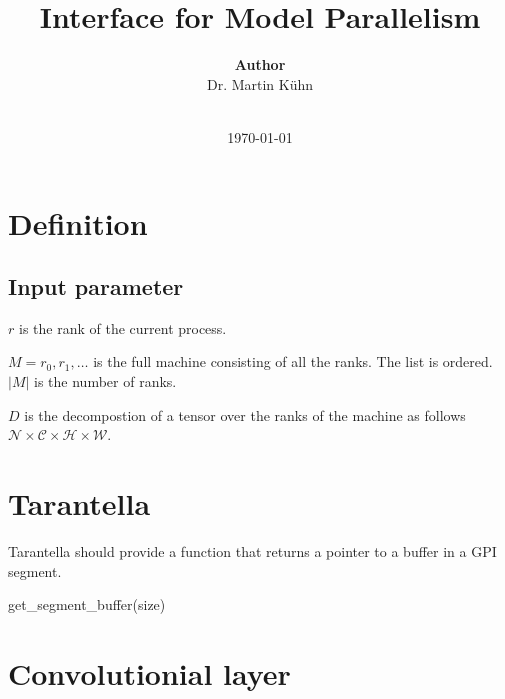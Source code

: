 \documentclass{report}
\begin{document}
\title{Interface for Model Parallelism}
\author{\textbf{Author}\\
  Dr. Martin Kühn\\
 \\[\baselineskip]
 }
\date{\today}

\maketitle

\allowdisplaybreaks

 \maketitle

 \begin{abstract} 
    
 \end{abstract}

\tableofcontents


\chapter{Definition}

\section{Input parameter}

$r$ is the rank of the current process.

$M=r_0, r_1, \dots$ is the full machine consisting of all the ranks. The list is ordered. $|M|$ is the number of ranks.

$D$ is the decompostion of a tensor over the ranks of the  machine
as follows
$\mathcal{N} \times \mathcal{C} \times \mathcal{H} \times \mathcal{W}$.

\chapter{Tarantella}

Tarantella should provide a function that returns a pointer to a buffer
in a GPI segment.

get\_segment\_buffer(size)

\chapter{Convolutionial layer}
\end{document}
